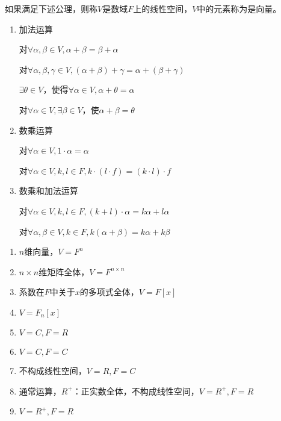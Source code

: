 如果满足下述公理，则称$V$是数域$F$上的线性空间，$V$中的元素称为是向量。
\begin{enumerate}
    \item 加法运算
    \begin{axiom}[交换律]
        对$\forall \alpha,\beta \in V, \alpha+\beta=\beta+\alpha$
    \end{axiom}

    \begin{axiom}[结合律]
        对$\forall \alpha, \beta, \gamma \in V, (\alpha+\beta)+\gamma=\alpha+(\beta+\gamma)$
    \end{axiom}

    \begin{axiom}[零元素]
        $\exists \theta \in V$，使得$\forall \alpha \in V, \alpha + \theta = \alpha$
    \end{axiom}

    \begin{axiom}[负元素]
        对$\forall \alpha \in V, \exists \beta \in V$，使$\alpha+\beta=\theta$
    \end{axiom}

    \item 数乘运算
    \begin{axiom}
        对$\forall \alpha \in V, 1 \cdot \alpha = \alpha$
    \end{axiom}

    \begin{axiom}
        对$\forall \alpha \in V, k,l \in F, k\cdot(l \cdot f) = (k \cdot l) \cdot f$
    \end{axiom}

    \item 数乘和加法运算
    \begin{axiom}
        对$\forall \alpha \in V, k,l \in F, (k+l)\cdot \alpha = k \alpha + l \alpha$
    \end{axiom}
    \begin{axiom}
        对$\forall \alpha, \beta \in V, k \in F, k(\alpha + \beta) = k \alpha + k \beta$
    \end{axiom}
\end{enumerate}

\begin{example}
    \begin{enumerate}
        \item $n$维向量，$V = F^n$
        \item $n \times n$维矩阵全体，$V = F^{n \times n}$
        \item 系数在$F$中关于$x$的多项式全体，$V = F[x]$
        \item $V = F_n[x]$ %
        \item $V = C, F = R$
        \item $V = C, F = C$
        \item 不构成线性空间，$V = R, F = C$
        \item 通常运算，$R^+$：正实数全体，不构成线性空间，$V = R^+, F = R$
        \item $V = R^+, F = R$
    \end{enumerate}
\end{example}

